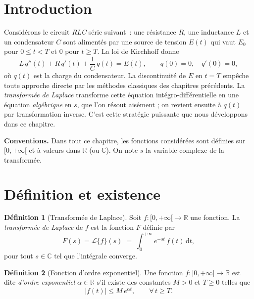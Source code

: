 \documentclass[12pt,a4paper,openany]{book}
\theoremstyle{definition}
\newtheorem{definition}{Définition}[chapter]
\theoremstyle{plain}
\theoremstyle{remark}
\newcommand{\R}{\mathbb{R}}
\newcommand{\C}{\mathbb{C}}
\newcommand{\dd}{\mathrm{d}}
\newcommand{\abs}[1]{\left|#1\right|}
\begin{document}
\section*{Introduction}

Considérons le circuit \emph{RLC} série suivant~:
une résistance $R$, une inductance $L$ et un condensateur $C$ sont
alimentés par une source de tension $E(t)$ qui vaut $E_0$ pour
$0\leq t < T$ et $0$ pour $t\geq T$. La loi de Kirchhoff donne
\[
  L\,q''(t) + R\,q'(t) + \frac{1}{C}\,q(t) = E(t),
  \qquad q(0)=0,\quad q'(0)=0,
\]
où $q(t)$ est la charge du condensateur. La discontinuité de $E$ en
$t=T$ empêche toute approche directe par les méthodes classiques des
chapitres précédents. La \emph{transformée de Laplace}
transforme cette équation intégro-différentielle en une équation
\emph{algébrique} en $s$, que l'on résout aisément ; on revient
ensuite à $q(t)$ par transformation inverse. C'est cette stratégie
puissante que nous développons dans ce chapitre.

\medskip

\noindent\textbf{Conventions.} Dans tout ce chapitre, les fonctions
considérées sont définies sur $[0,+\infty[$ et à valeurs dans $\R$
(ou $\C$). On note $s$ la variable complexe de la transformée.

\section{Définition et existence}\label{sec:laplace-def}

\begin{definition}[Transformée de Laplace]\label{def:laplace}
  Soit $f:[0,+\infty[\to\R$ une fonction. La \emph{transformée de
  Laplace} de $f$ est la fonction $F$ définie par
  \[
    F(s) = \mathcal{L}\{f\}(s)
    \;=\; \int_{0}^{+\infty} e^{-st}\,f(t)\,\dd t,
  \]
  pour tout $s\in\C$ tel que l'intégrale converge.
\end{definition}

\begin{definition}[Fonction d'ordre exponentiel]\label{def:ordre-exp}
  Une fonction $f:[0,+\infty[\to\R$ est dite \emph{d'ordre exponentiel}
  $\alpha\in\R$ s'il existe des constantes $M>0$ et $T\geq 0$ telles
  que
  \[
    \abs{f(t)} \leq M\,e^{\alpha t}, \qquad \forall\, t\geq T.
  \]
\end{definition}
\end{document}
